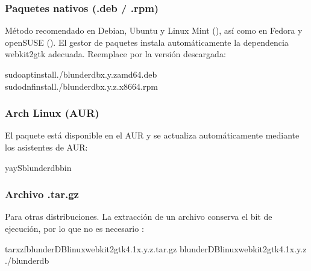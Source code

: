 \documentclass[letterpaper,10pt,spanish]{sphinxmanual}
\begin{document}
\subsubsection{Paquetes nativos (.deb / .rpm)}
\label{\detokenize{telecharge_install:paquets-natifs-deb-rpm}}
\sphinxAtStartPar
Método recomendado en Debian, Ubuntu y Linux Mint (), así como en Fedora y openSUSE (). El gestor de paquetes instala automáticamente la dependencia webkit2gtk adecuada. Reemplace  por la versión descargada:

\begin{sphinxVerbatim}[commandchars=\\\{\}]
sudoaptinstall./blunderdb\PYGZus{}x.y.z\PYGZus{}amd64.deb
sudodnfinstall./blunderdb\PYGZhy{}x.y.z.x86\PYGZus{}64.rpm
\end{sphinxVerbatim}


\subsubsection{Arch Linux (AUR)}
\label{\detokenize{telecharge_install:arch-linux-aur}}
\sphinxAtStartPar
El paquete  está disponible en el AUR y se actualiza automáticamente mediante los asistentes de AUR:

\begin{sphinxVerbatim}[commandchars=\\\{\}]
yay\PYGZhy{}Sblunderdb\PYGZhy{}bin
\end{sphinxVerbatim}


\subsubsection{Archivo .tar.gz}
\label{\detokenize{telecharge_install:archive-tar-gz}}
\sphinxAtStartPar
Para otras distribuciones. La extracción de un archivo conserva el bit de ejecución, por lo que no es necesario :

\begin{sphinxVerbatim}[commandchars=\\\{\}]
tarxzfblunderDB\PYGZhy{}linux\PYGZhy{}webkit2gtk\PYGZhy{}4.1\PYGZhy{}x.y.z.tar.gz
blunderDB\PYGZhy{}linux\PYGZhy{}webkit2gtk\PYGZhy{}4.1\PYGZhy{}x.y.z
./blunderdb
\end{sphinxVerbatim}
\end{document}
